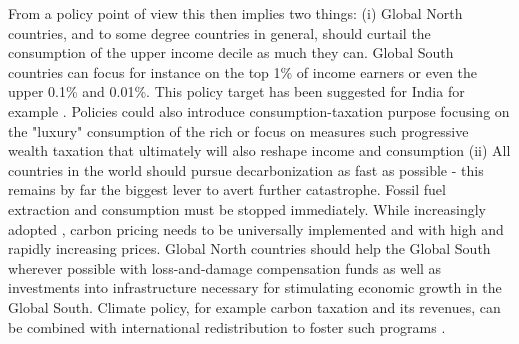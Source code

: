 \documentclass{article}
\begin{document}
From a policy point of view this then implies two things: (i) Global North countries, and to some degree countries in general, should curtail the consumption of the upper income decile as much they can. Global South countries can focus for instance on the top 1\% of income earners or even the upper 0.1\% and 0.01\%. This policy target has been suggested for India for example \parencite{bharti2024income}. Policies could also introduce consumption-taxation purpose focusing on the "luxury" consumption of the rich \parencite{oswald2023luxury} or focus on measures such progressive wealth taxation \parencite{saez2019progressive} that ultimately will also reshape income and consumption (ii) All countries in the world should pursue decarbonization as fast as possible - this remains by far the biggest lever to avert further catastrophe. Fossil fuel extraction and consumption must be stopped immediately. While increasingly adopted \parencite{worldbank2024state}, carbon pricing needs to be universally implemented and with high and rapidly increasing prices. Global North countries should help the Global South wherever possible with loss-and-damage compensation funds as well as investments into infrastructure necessary for stimulating economic growth in the Global South. Climate policy, for example carbon taxation and its revenues, can be combined with international redistribution to foster such programs \parencite{aleksandrova2024unlocking, feng2023global}.

\end{document}
